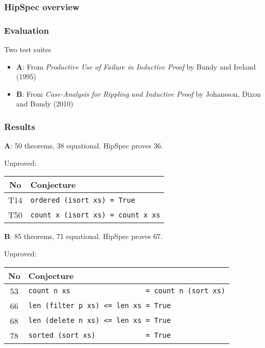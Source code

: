 \documentclass[serif,professionalfont]{beamer}
\begin{document}
\begin{frame}[fragile]
\frametitle{HipSpec overview}

\end{frame}

\begin{frame}
  \frametitle{Evaluation}

  Two test suites

  \begin{itemize}

    \item \textbf{A}: From
      \emph{Productive Use of Failure in Inductive Proof}
      by Bundy and Ireland (1995)

    \item \textbf{B}: From
      \emph{Case-Analysis for Rippling and Inductive Proof}
      by Johansson, Dixon and Bundy (2010)

  \end{itemize}

\end{frame}

\begin{frame}[fragile]
  \frametitle{Results}

  \textbf{A}: 50 theorems, 38 equational. HipSpec proves 36.

  \vspace{\baselineskip}

  Unproved:
  \begin{center}
  \begin{tabular}{>{\small}c >{\small}l}
  No  & Conjecture \\
  \hline
  T14 & \verb!ordered (isort xs) = True! \\
  T50 & \verb!count x (isort xs) = count x xs! \\
  \end{tabular}
  \end{center}

  \pause

  \textbf{B}: 85 theorems, 71 equational. HipSpec proves 67.

  \vspace{\baselineskip}

  Unproved:
  \begin{center}
  \begin{tabular}{>{\small}c >{\small}l}
   No & Conjecture \\
   \hline
   53 & \verb!count n xs                  = count n (sort xs)! \\
   66 & \verb!len (filter p xs) <= len xs = True! \\
   68 & \verb!len (delete n xs) <= len xs = True! \\
   78 & \verb!sorted (sort xs)            = True! \\
  \end{tabular}
  \end{center}

\end{frame}
\end{document}
